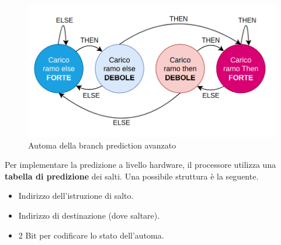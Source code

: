 \begin{figure}[!ht]
    \centering
    \includegraphics[width=.5\textwidth]{img/automa-complesso.png}
    \caption{Automa della branch prediction avanzato}\label{img:automa-complesso}
\end{figure}

Per implementare la predizione a livello hardware, il processore utilizza una \textbf{tabella di predizione} dei salti. Una possibile struttura è la seguente.
\begin{itemize}
    \item Indirizzo dell'istruzione di salto.
    \item Indirizzo di destinazione (dove saltare).
    \item 2 Bit per codificare lo stato dell'automa.
\end{itemize}


